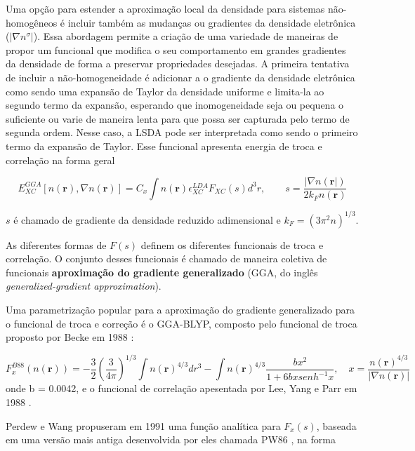 			Uma opção para estender a aproximação local da densidade para sistemas não-homogêneos é incluir também as mudanças ou gradientes da densidade eletrônica ($|\nabla n^\sigma|$). Essa abordagem permite a criação de uma variedade de maneiras de propor um funcional que modifica o seu comportamento em grandes gradientes da densidade de forma a preservar propriedades desejadas. A primeira tentativa de incluir a não-homogeneidade é adicionar a o gradiente da densidade eletrônica como sendo uma expansão de Taylor da densidade uniforme e limita-la ao segundo termo da expansão, esperando que inomogeneidade seja ou pequena o suficiente ou varie de maneira lenta para que possa ser capturada pelo termo de segunda ordem. Nesse caso, a LSDA pode ser interpretada como sendo o primeiro termo da expansão de Taylor. Esse funcional apresenta energia de troca e correlação na forma geral
			
			\begin{equation}
			\label{GGA}
				E_{XC}^{GGA}[n(\textbf{r}), \nabla n(\textbf{r})] = C_x\int n(\textbf{r}) \epsilon_{XC}^{LDA}F_{XC}(s) d^3r, \qquad s = \frac{|\nabla n(\textbf{r}|)}{2k_Fn(\textbf{r})}
			\end{equation}
			
			$s$ é chamado de gradiente da densidade reduzido adimensional e $k_F = (3\pi^2n)^{1/3}$. 
			
			As diferentes formas de $F(s)$ definem os diferentes funcionais de troca e correlação. O conjunto desses funcionais é chamado de maneira coletiva de funcionais \textbf{aproximação do gradiente generalizado} (GGA, do inglês \textit{generalized-gradient approximation}).
			
			Uma parametrização popular para a aproximação do gradiente generalizado para o funcional de troca e correção é o GGA-BLYP, composto pelo funcional de troca proposto por Becke em 1988 \cite{becke1988density}: 
			
			\begin{equation}
				F_x^{B88}(n(\textbf{r})) = -\frac{3}{2}\left( \frac{3}{4\pi}\right)^{1/3}\int n(\textbf{r})^{4/3} dr^3 - \int n(\textbf{r})^{4/3}\frac{bx^2}{1 + 6bxsenh^{-1}x} , \quad x = \frac{n(\textbf{r})^{4/3}}{|\nabla n(\textbf{r})|}
			\end{equation}
			onde b = 0.0042, e o funcional de correlação apesentada por Lee, Yang e Parr em 1988 \cite{lee1988development}.
			
			Perdew e Wang \cite{perdew1991electronic} propuseram em 1991 uma função analítica para $F_x(s)$, baseada em uma versão mais antiga desenvolvida por eles chamada PW86 \cite{perdew1986accurate}, na forma
			
